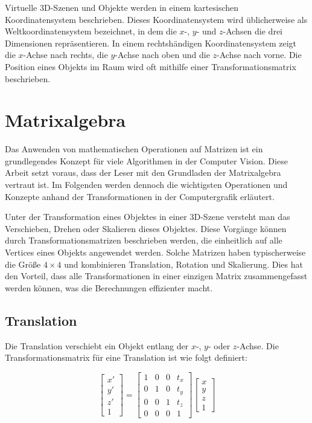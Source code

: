 Virtuelle 3D-Szenen und Objekte werden in einem kartesischen Koordinatensystem beschrieben. Dieses Koordinatensystem wird üblicherweise als Weltkoordinatensystem bezeichnet, in dem die \(x\)-, \(y\)- und \(z\)-Achsen die drei Dimensionen repräsentieren. In einem rechtshändigen Koordinatensystem zeigt die \(x\)-Achse nach rechts, die \(y\)-Achse nach oben und die \(z\)-Achse nach vorne. Die Position eines Objekts im Raum wird oft mithilfe einer Transformationsmatrix beschrieben.

\section{Matrixalgebra}

Das Anwenden von mathematischen Operationen auf Matrizen ist ein grundlegendes Konzept für viele Algorithmen in der Computer Vision. Diese Arbeit setzt voraus, dass der Leser mit den Grundladen der Matrixalgebra vertraut ist. Im Folgenden werden dennoch die wichtigsten Operationen und Konzepte anhand der Transformationen in der Computergrafik erläutert.

Unter der Transformation eines Objektes in einer 3D-Szene versteht man das Verschieben, Drehen oder Skalieren dieses Objektes. Diese Vorgänge können durch Transformationsmatrizen beschrieben werden, die einheitlich auf alle Vertices eines Objekts angewendet werden. Solche Matrizen haben typischerweise die Größe \(4 \times 4\) und kombinieren Translation, Rotation und Skalierung. Dies hat den Vorteil, dass alle Transformationen in einer einzigen Matrix zusammengefasst werden können, was die Berechnungen effizienter macht.

\subsection{Translation}

Die Translation verschiebt ein Objekt entlang der \(x\)-, \(y\)- oder \(z\)-Achse. Die Transformationsmatrix für eine Translation ist wie folgt definiert:

\begin{equation}
\begin{bmatrix}
x' \\ y' \\ z' \\ 1
\end{bmatrix}
=
\begin{bmatrix}
1 & 0 & 0 & t_x \\
0 & 1 & 0 & t_y \\
0 & 0 & 1 & t_z \\
0 & 0 & 0 & 1
\end{bmatrix}
\begin{bmatrix}
x \\ y \\ z \\ 1
\end{bmatrix}
\end{equation}

